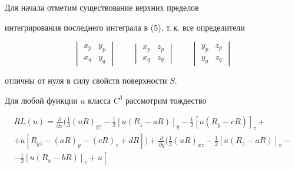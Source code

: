 \begin{pf} Для начала отметим существование верхних пределов


интегрирования последнего интеграла в (5), т.\,к. все определители


$$


\begin{vmatrix}


x_{p} & y_{p} \\


x_{q} & y_{q}


\end{vmatrix}


\qquad


\begin{vmatrix}


x_{p} & z_{p} \\


x_{q} & z_{q}


\end{vmatrix}


\qquad


\begin{vmatrix}


y_{p} & z_{p} \\


y_{q} & z_{q}


\end{vmatrix}


$$


отличны от нуля в силу свойств поверхности $S$.





Для любой функции $u$ класса $C^{3}$ рассмотрим тождество


\begin{gather*}


RL(u)=\frac{\partial }{\partial x} \biggl( \frac{1}{3} (uR)_{yz}-\frac{1}{2} \left[


u(R_{z}-aR)\right] _{y}-\frac{1}{2} \left[ u(R_{y}-cR)\right] _{z}+\\


%


+ u\left[


R_{yz}-(aR)_{y}-(cR)_{z}+dR\right] \biggr) + \frac{\partial }{\partial y}


\biggl( \frac{1}{3} (uR)_{xz}-\frac{1}{2} \left[ u(R_{z}-aR)\right] _{x}-\\


%


-\frac{1}{2} \left[ u(R_{x}-bR)\right] _{z}+u\left[



\end{gather*}
\end{pf}
